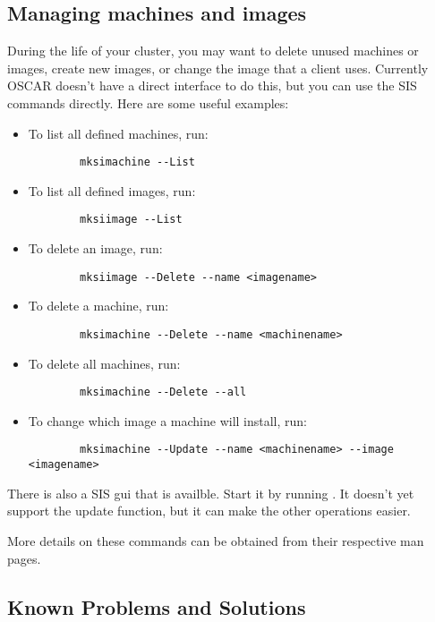 \subsection{Managing machines and images}
\label{app:troubleshooting-machines-images}
During the life of your cluster, you may want to delete unused machines
or images, create new images, or change the image that a client uses.
Currently OSCAR doesn't have a direct interface to do this, but you can use
the SIS commands directly. Here are some useful examples:
\begin{itemize}
\item To list all defined machines, run:
\begin{verbatim}
        mksimachine --List
\end{verbatim}
\item To list all defined images, run:
\begin{verbatim}
        mksiimage --List
\end{verbatim}
\item To delete an image, run:
\begin{verbatim}
        mksiimage --Delete --name <imagename>
\end{verbatim}
\item To delete a machine, run:
\begin{verbatim}
        mksimachine --Delete --name <machinename>
\end{verbatim}
\item To delete all machines, run:
\begin{verbatim}
        mksimachine --Delete --all
\end{verbatim}
\item To change which image a machine will install, run:
\begin{verbatim}
        mksimachine --Update --name <machinename> --image <imagename>
\end{verbatim}
\end{itemize}

There is also a SIS gui that is availble. Start it by running . It 
doesn't yet support the update function, but it can make the other operations
easier.

More details on these commands can be obtained from their respective man
pages.


\subsection{Known Problems and Solutions}
\label{app:troubleshooting-known-problems}

